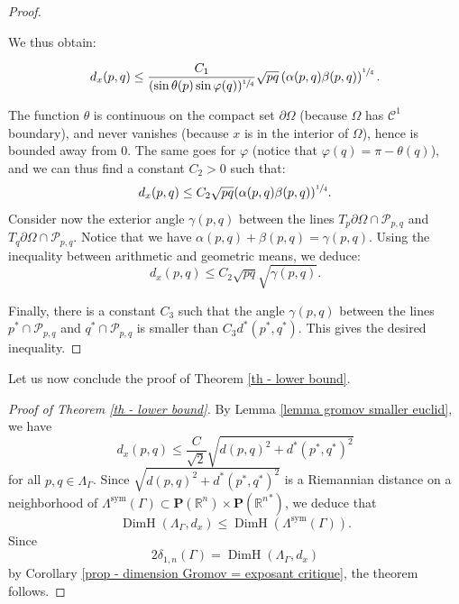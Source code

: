 \documentclass[11pt]{article}
\numberwithin{equation}{section}
\theoremstyle{definition}
\newcommand{\proj}{\mathbf{P}}
\newcommand{\R}{\mathbb{R}}
\DeclareMathOperator{\DimH}{DimH}
\let\p\varphi
\let\G\Gamma
\begin{document}
\begin{proof}
\begin{figure}[htb]
\caption{}
\label{figure angles gromov distance}
\end{figure}

We thus obtain:

\[ d_x(p,q) \leq \frac{C_1}{(\sin \theta(p) \sin \p(q))^{\sfrac{1}{4}}} \sqrt{pq} \left( \alpha(p,q)\beta(p,q) \right)^{\sfrac{1}{4}}. \]

The function $\theta$ is continuous on the compact set $\partial \Omega$ (because $\Omega$ has $\mathcal C^1$ boundary), and never vanishes (because $x$ is in the interior of $\Omega$), hence is bounded away from $0$. The same goes for $\p$ (notice that $\p(q)=\pi-\theta(q)$), and we can thus find a constant $C_2>0$ such that:
\[ d_x(p,q)\leq C_2 \sqrt{pq} (\alpha(p,q)\beta(p,q))^{\sfrac{1}{4}}.\]
Consider now the exterior angle $\gamma(p,q)$ between the lines $T_p\partial\Omega \cap \mathcal P_{p,q}$ and $T_q\partial\Omega \cap \mathcal P_{p,q}$.
Notice that we have $\alpha(p,q)+\beta(p,q)=\gamma(p,q)$. Using the inequality between arithmetic and geometric means, we deduce:
\[ d_x(p,q)\leq C_2 \sqrt{pq} \sqrt{\gamma(p,q)}. \]

Finally, there is a constant $C_3$ such that the angle $\gamma(p,q)$ between the lines $p^*\cap \mathcal P_{p,q}$ and $q^* \cap \mathcal P_{p,q}$ is smaller than $C_3 d^*(p^*,q^*)$. This gives the desired inequality.
\end{proof}

Let us now conclude the proof of Theorem \ref{th - lower bound}.

\begin{proof}[Proof of Theorem \ref{th - lower bound}]
By Lemma \ref{lemma gromov smaller euclid}, we have
\[d_x(p,q) \leq \frac{C}{\sqrt{2}}\sqrt{d(p,q)^2 + d^*(p^*,q^*)^2}\]
for all $p,q \in \Lambda_\Gamma$. Since $\sqrt{d(p,q)^2 + d^*(p^*,q^*)^2}$ is a Riemannian distance on a neighborhood of $\Lambda^{\mathrm{sym}}(\G) \subset \proj(\R^n) \times \proj({\R^n}^*)$, we deduce that
\[\DimH(\Lambda_\G, d_x) \leq \DimH(\Lambda^{\mathrm{sym}}(\G)).\]
Since
\[2\delta_{1,n}(\G) = \DimH(\Lambda_\G, d_x)\]
by Corollary \ref{prop - dimension Gromov = exposant critique}, the theorem follows.
\end{proof}
\end{document}
